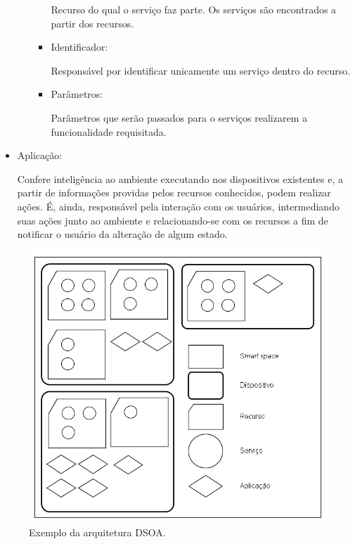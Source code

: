 \begin{itemize}
\begin{itemize}
\begin{itemize}
					Recurso do qual o serviço faz parte. Os serviços são encontrados a partir dos recursos.
				\item Identificador:

					Responsável por identificar unicamente um serviço dentro do recurso.
				\item Parâmetros:

					Parâmetros que serão passados para o serviços realizarem a funcionalidade requisitada.
			\end{itemize}
		\end{itemize}
	\item Aplicação:
	
		Confere inteligência ao ambiente executando nos dispositivos existentes e, a partir de informações providas pelos recursos conhecidos, podem realizar ações. É, ainda, responsável pela interação com os usuários, intermediando suas ações junto ao ambiente e relacionando-se com os recursos a fim de notificar o usuário da alteração de algum estado.
\end{itemize}

\begin{figure}[ht]
	\center
	\includegraphics[scale=0.6]{imagens/arquiteturaDSOA}
	\caption{Exemplo da arquitetura DSOA.}
	\label{fig:arquiteturaDSOA}
\end{figure}
